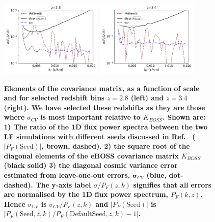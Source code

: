 \begin{figure}
    \centering
    \includegraphics[width=0.45\textwidth]{figures/err-2.8.pdf}
    \includegraphics[width=0.45\textwidth]{figures/err-3.4.pdf}
    \caption{\label{fig:covariance_loo}
     \textbf{Elements of the covariance matrix, as a function of scale and for selected redshift bins $z=2.8$ (left) and $z=3.4$ (right). We have selected these redshifts as they are those where $\sigma_{CV}$ is most important relative to $K_{BOSS}$. 
    Shown are:  1) The ratio of the 1D flux power spectra between the two LF simulations with different seeds discussed in Ref.~\protect\cite{2023simsuite} ($|P_F(\mathrm{Seed})|$, brown, dashed).
    2) the square root of the diagonal elements of the eBOSS covariance matrix $K_{BOSS}$ (black solid) 3) the diagonal cosmic variance error estimated from leave-one-out errors, $\boldsymbol{\sigma}_{CV}$ (blue, dot-dashed). The y-axis label $\sigma/P_F(z,k)$ signifies that all errors are normalised by the 1D flux power spectrum, $P_F(k, z)$. Hence $\sigma_{CV}$ is $\sigma_{CV}/ P_F(z,k)$ and $|P_F(\mathrm{Seed})|$ is $|P_F(\mathrm{Seed}, z,k)/P_F(\mathrm{Default Seed}, z, k)-1|$.}}
\end{figure}

